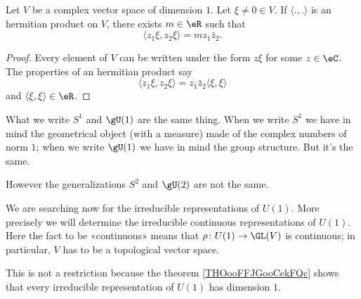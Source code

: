 \begin{proposition}
	Let \( V\) be a complex vector space of dimension \( 1\). Let \( \xi\neq 0\in V\). If \( \langle ., .\rangle \) is an hermitian product on \( V\), there exists \( m\in \eR\) such that
	\begin{equation}
		\langle z_1\xi, z_2\xi\rangle =mz_1\bar z_2.
	\end{equation}
\end{proposition}

\begin{proof}
	Every element of \( V\) can be written under the form \( z\xi\) for some \( z\in \eC\). The properties of an hermitian product say
	\begin{equation}
		\langle z_1\xi, z_2\xi\rangle =z_1\bar z_2\langle \xi, \xi\rangle
	\end{equation}
	and \( \langle \xi, \xi\rangle \in \eR\).
\end{proof}

\begin{normaltext}
	What we write \( S^1\) and \( \gU(1)\) are the same thing. When we write \( S^1\) we have in mind the geometrical object (with a measure) made of the complex numbers of norm \( 1\); when we write \( \gU(1)\) we have in mind the group structure. But it's the same.

	However the generalizations \( S^2\) and \( \gU(2)\) are not the same.
\end{normaltext}

\begin{normaltext}
	We are searching now for the irreducible representations of \( U(1)\). More precisely we will determine the irreducible continuous representations of \( U(1)\). Here the fact to be «continuous» means that \( \rho\colon U(1)\to \GL(V)\) is continuous; in particular, \( V\) has to be a topological vector space.

	This is not a restriction because the theorem \ref{THOooFFJGooCekFQc} shows that every irreducible representation of \( U(1)\) has dimension \( 1\).
\end{normaltext}

